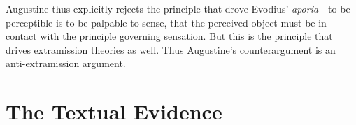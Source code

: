 \documentclass[12pt]{article}
\begin{document}

Augustine thus explicitly rejects the principle that drove Evodius' \emph{aporia}---to be perceptible is to be palpable to sense, that the perceived object must be in contact with the principle governing sensation. But this is the principle that drives extramission theories as well. Thus Augustine's counterargument is an anti-extramis\-sion argument.


\section{The Textual Evidence} %
\label{sec:the_textual_evidence}
\end{document}
